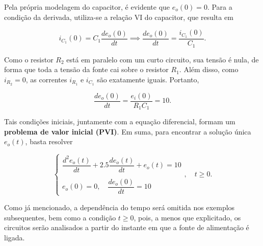 \documentclass{article}
\numberwithin{equation}{section}
\let\dfr\dfrac
\begin{document}
\begin{center}
\end{center}

Pela própria modelagem do capacitor, é evidente que $e_o(0)=0$. Para a condição da derivada, utiliza-se a relação VI do capacitor, que resulta em

\begin{equation*}
    i_{C_1}(0) = C_1\dfr{de_o(0)}{dt} \implies \dfr{de_o(0)}{dt} = \dfr{i_{C_1}(0)}{C_1}.
\end{equation*}

\noindent Como o resistor $R_2$ está em paralelo com um curto circuito, sua tensão é nula, de forma que toda a tensão da fonte cai sobre o resistor $R_1$. Além disso, como $i_{R_2}=0$, as correntes $i_{R_1}$ e $i_{C_1}$ são exatamente iguais. Portanto,

\begin{equation*}
    \dfr{de_o(0)}{dt} = \dfr{e_i(0)}{R_1C_1} = 10.
\end{equation*}

\vspace{2mm}

\noindent Tais condições iniciais, juntamente com a equação diferencial, formam um \textbf{problema de valor inicial (PVI)}. Em suma, para encontrar a solução única $e_o(t)$, basta resolver

\begin{equation}
    \begin{cases}
        \dfr{ d^2e_o(t) }{ dt }+ 2.5 \dfr{ de_o(t) }{ dt } + e_o(t) = 10\\ \\
        e_o(0) = 0, \quad \dfr{de_o(0)}{dt}=10
    \end{cases} \label{eq:pvi}
    , \quad t \geqslant 0.
\end{equation}

\noindent Como já mencionado, a dependência do tempo será omitida nos exemplos subsequentes, bem como a condição $t \geqslant 0$, pois, a menos que explicitado, os circuitos serão analisados a partir do instante em que a fonte de alimentação é ligada.
\end{document}
